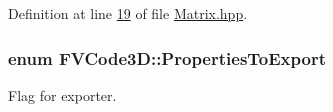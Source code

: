 Definition at line \hyperlink{Matrix_8hpp_source_l00019}{19} of file \hyperlink{Matrix_8hpp_source}{Matrix.\+hpp}.

\subsubsection[{\texorpdfstring{Properties\+To\+Export}{PropertiesToExport}}]{\setlength{\rightskip}{0pt plus 5cm}enum {\bf F\+V\+Code3\+D\+::\+Properties\+To\+Export}}\hypertarget{namespaceFVCode3D_ab3abc77722284ce4344be90bb61c1a41}{}\label{namespaceFVCode3D_ab3abc77722284ce4344be90bb61c1a41}


Flag for exporter. 

